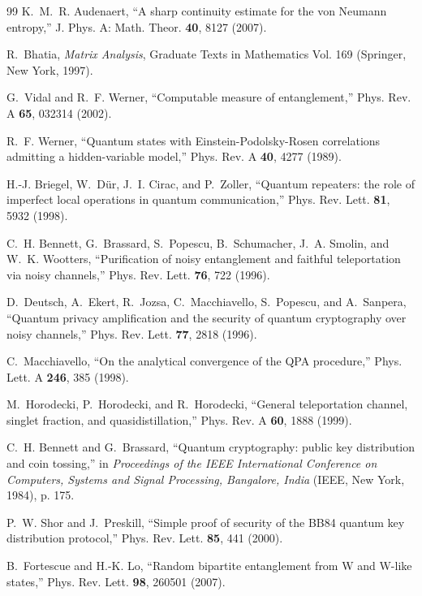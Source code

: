 \documentclass[aps,pra,reprint,nofootinbib,superscriptaddress]{revtex4-2}
\theoremstyle{plain}
\theoremstyle{definition}
\theoremstyle{remark}
\begin{document}
\begin{thebibliography}{99}
K.~M.~R. Audenaert,
``A sharp continuity estimate for the von Neumann entropy,''
J. Phys. A: Math. Theor. \textbf{40}, 8127 (2007).

R.~Bhatia,
\emph{Matrix Analysis},
Graduate Texts in Mathematics Vol. 169
(Springer, New York, 1997).

G.~Vidal and R.~F. Werner,
``Computable measure of entanglement,''
Phys. Rev. A \textbf{65}, 032314 (2002).

R.~F. Werner,
``Quantum states with Einstein-Podolsky-Rosen correlations admitting a
hidden-variable model,''
Phys. Rev. A \textbf{40}, 4277 (1989).

H.-J. Briegel, W.~D\"ur, J.~I. Cirac, and P.~Zoller,
``Quantum repeaters: the role of imperfect local operations in quantum
communication,''
Phys. Rev. Lett. \textbf{81}, 5932 (1998).

C.~H. Bennett, G.~Brassard, S.~Popescu, B.~Schumacher, J.~A. Smolin,
and W.~K. Wootters,
``Purification of noisy entanglement and faithful teleportation via
noisy channels,''
Phys. Rev. Lett. \textbf{76}, 722 (1996).

D.~Deutsch, A.~Ekert, R.~Jozsa, C.~Macchiavello, S.~Popescu, and
A.~Sanpera,
``Quantum privacy amplification and the security of quantum
cryptography over noisy channels,''
Phys. Rev. Lett. \textbf{77}, 2818 (1996).

C.~Macchiavello,
``On the analytical convergence of the QPA procedure,''
Phys. Lett. A \textbf{246}, 385 (1998).

M.~Horodecki, P.~Horodecki, and R.~Horodecki,
``General teleportation channel, singlet fraction, and
quasidistillation,''
Phys. Rev. A \textbf{60}, 1888 (1999).

C.~H. Bennett and G.~Brassard,
``Quantum cryptography: public key distribution and coin tossing,''
in \emph{Proceedings of the IEEE International Conference on Computers,
Systems and Signal Processing, Bangalore, India} (IEEE, New York,
1984), p. 175.

P.~W. Shor and J.~Preskill,
``Simple proof of security of the BB84 quantum key distribution
protocol,''
Phys. Rev. Lett. \textbf{85}, 441 (2000).

B.~Fortescue and H.-K. Lo,
``Random bipartite entanglement from W and W-like states,''
Phys. Rev. Lett. \textbf{98}, 260501 (2007).


\end{thebibliography}
\end{document}
